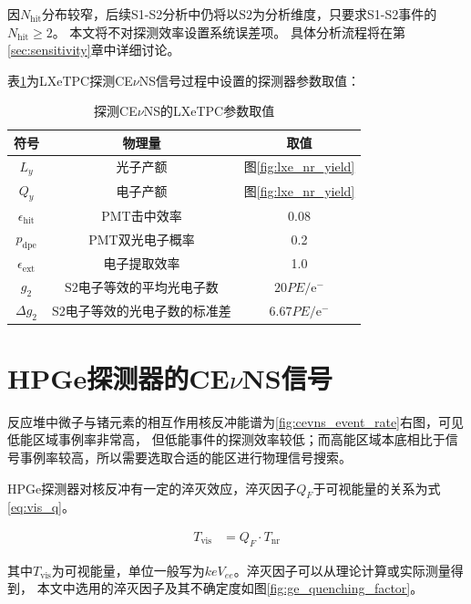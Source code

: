 因$N_\mathrm{hit}$分布较窄，后续S1-S2分析中仍将以$\mathrm{S2}$为分析维度，只要求S1-S2事件的$N_\mathrm{hit}\ge2$。
本文将不对探测效率设置系统误差项。
具体分析流程将在第\ref{sec:sensitivity}章中详细讨论。

表\ref{tab:lxe_tpc_parameters}为LXeTPC探测CE$\nu$NS信号过程中设置的探测器参数取值：

\begin{table}
  \centering
  \caption{探测CE$\nu$NS的LXeTPC参数取值}
  \begin{tabular}{ccc}
    \toprule
    符号 & 物理量 & 取值 \\
    \midrule
    $L_y$ & 光子产额 & 图\ref{fig:lxe_nr_yield} \\
    $Q_y$ & 电子产额 & 图\ref{fig:lxe_nr_yield} \\
    $\epsilon_\mathrm{hit}$ & PMT击中效率 & 0.08 \\
    $p_\mathrm{dpe}$ & PMT双光电子概率 & 0.2 \\
    $\epsilon_\mathrm{ext}$ & 电子提取效率 & 1.0 \\
    $g_2$ & $\mathrm{S2}$电子等效的平均光电子数 & $20\si{PE/\mathrm{e}^-}$ \\
    $\Delta g_2$ & $\mathrm{S2}$电子等效的光电子数的标准差 & $6.67\si{PE/\mathrm{e}^-}$ \\
    \bottomrule
  \end{tabular}
  \label{tab:lxe_tpc_parameters}
\end{table}

\section{HPGe探测器的CE$\nu$NS信号}
\label{sec:hpge_sig}

反应堆中微子与锗元素的相互作用核反冲能谱为\ref{fig:cevns_event_rate}右图，可见低能区域事例率非常高，
但低能事件的探测效率较低；而高能区域本底相比于信号事例率较高，所以需要选取合适的能区进行物理信号搜索。

HPGe探测器对核反冲有一定的淬灭效应，淬灭因子$Q_F$于可视能量的关系为式\ref{eq:vis_q}。

\begin{align}
  \label{eq:vis_q}
  T_\mathrm{vis} &= Q_F\cdot T_\mathrm{nr}
\end{align}

其中$T_\mathrm{vis}$为可视能量，单位一般写为$\si{keV_{ee}}$。淬灭因子可以从理论计算或实际测量得到\cite{zhao_search_2016}，
本文中选用的淬灭因子及其不确定度如图\ref{fig:ge_quenching_factor}。

